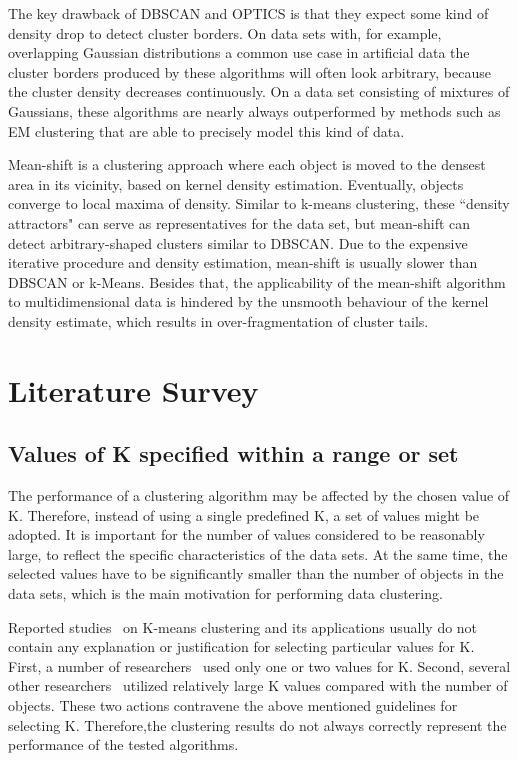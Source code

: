 \begin{itemize}
The key drawback of DBSCAN and OPTICS is that they expect some kind of density drop to detect cluster borders.
On data sets with, for example, overlapping Gaussian distributions a common use case in artificial data the
cluster borders produced by these algorithms will often look arbitrary, because the cluster density decreases
continuously. On a data set consisting of mixtures of Gaussians, these algorithms are nearly always outperformed
by methods such as EM clustering that are able to precisely model this kind of data.

Mean-shift is a clustering approach where each object is moved to the densest area in its vicinity, based on kernel
density estimation. Eventually, objects converge to local maxima of density. Similar to k-means clustering, these
``density attractors" can serve as representatives for the data set, but mean-shift can detect arbitrary-shaped
clusters similar to DBSCAN. Due to the expensive iterative procedure and density estimation, mean-shift is usually
slower than DBSCAN or k-Means. Besides that, the applicability of the mean-shift algorithm to multidimensional data
is hindered by the unsmooth behaviour of the kernel density estimate, which results in over-fragmentation of cluster
tails.
\end{itemize}

\section{Literature Survey}

\subsection{Values of K specified within a range or set}
The  performance  of  a  clustering  algorithm  may  be
affected by the chosen value of K. Therefore, instead
of using a single predefined K, a set of values might
be   adopted.   It   is   important   for   the   number   of
values  considered  to  be  reasonably  large,  to  reflect
the  specific  characteristics  of  the  data  sets.  At  the
same  time,  the  selected  values  have  to  be  significantly
smaller  than  the  number  of  objects  in  the
data sets, which is the main motivation for performing data clustering.

Reported studies~\cite{han00, daoud95, daoud96, ranka98, bilmes97, bengio95}
on K-means clustering and
its  applications  usually  do  not  contain  any  explanation
or  justification  for  selecting  particular  values for K.
First,  a  number  of  researchers~\cite{bilmes97, bengio95} used  only  one  or  two  values  for K.
Second, several  other  researchers~\cite{han00, daoud96} utilized relatively  large K
values  compared  with  the  number of  objects.  These  two  actions  contravene
the  above mentioned  guidelines  for  selecting K. Therefore,the
clustering  results  do  not  always  correctly  represent
the performance of the tested algorithms.

